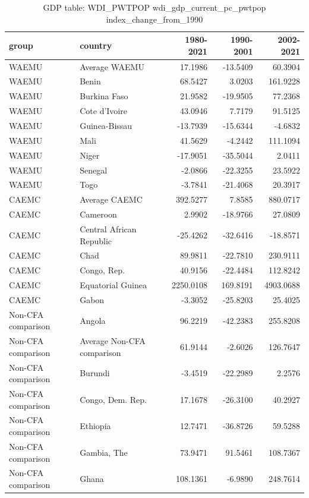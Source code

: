 \begin{table}

\caption{GDP table: WDI_PWTPOP wdi_gdp_current_pc_pwtpop index_change_from_1990}
\centering
\begin{tabular}[t]{llrrr}
\toprule
group & country & 1980-2021 & 1990-2001 & 2002-2021\\
\midrule
WAEMU & Average WAEMU & 17.1986 & -13.5409 & 60.3904\\
WAEMU & Benin & 68.5427 & 3.0203 & 161.9228\\
WAEMU & Burkina Faso & 21.9582 & -19.9505 & 77.2368\\
WAEMU & Cote d'Ivoire & 43.0946 & 7.7179 & 91.5125\\
WAEMU & Guinea-Bissau & -13.7939 & -15.6344 & -4.6832\\
\addlinespace
WAEMU & Mali & 41.5629 & -4.2442 & 111.1094\\
WAEMU & Niger & -17.9051 & -35.5044 & 2.0411\\
WAEMU & Senegal & -2.0866 & -22.3255 & 23.5922\\
WAEMU & Togo & -3.7841 & -21.4068 & 20.3917\\
CAEMC & Average CAEMC & 392.5277 & 7.8585 & 880.0717\\
\addlinespace
CAEMC & Cameroon & 2.9902 & -18.9766 & 27.0809\\
CAEMC & Central African Republic & -25.4262 & -32.6416 & -18.8571\\
CAEMC & Chad & 89.9811 & -22.7810 & 230.9111\\
CAEMC & Congo, Rep. & 40.9156 & -22.4484 & 112.8242\\
CAEMC & Equatorial Guinea & 2250.0108 & 169.8191 & 4903.0688\\
\addlinespace
CAEMC & Gabon & -3.3052 & -25.8203 & 25.4025\\
Non-CFA comparison & Angola & 96.2219 & -42.2383 & 255.8208\\
Non-CFA comparison & Average Non-CFA comparison & 61.9144 & -2.6026 & 126.7647\\
Non-CFA comparison & Burundi & -3.4519 & -22.2989 & 2.2576\\
Non-CFA comparison & Congo, Dem. Rep. & 17.1678 & -26.3100 & 40.2927\\
\addlinespace
Non-CFA comparison & Ethiopia & 12.7471 & -36.8726 & 59.5288\\
Non-CFA comparison & Gambia, The & 73.9471 & 91.5461 & 108.7367\\
Non-CFA comparison & Ghana & 108.1361 & -6.9890 & 248.7614\\

\end{tabular}
\end{table}
